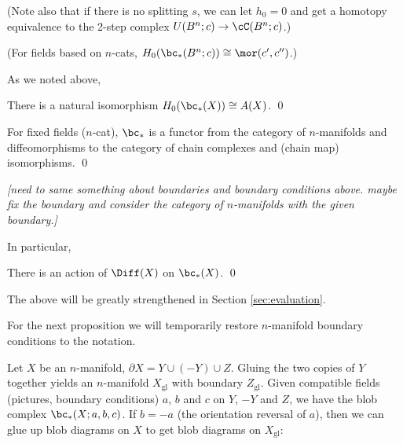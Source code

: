 \documentclass[11pt,leqno]{amsart}
\def\bd{\partial}
\def\sgl{_\mathrm{gl}}
\def\nn#1{{{\it \small [#1]}}}
\begin{document}
(Note also that if there is no splitting $s$, we can let $h_0 = 0$ and get a homotopy
equivalence to the 2-step complex $U(B^n; c) \to \cC(B^n; c)$.)

(For fields based on $n$-cats, $H_0(\bc_*(B^n; c)) \cong \mor(c', c'')$.)

\medskip

As we noted above,
\begin{prop}
There is a natural isomorphism $H_0(\bc_*(X)) \cong A(X)$.
\qed
\end{prop}







\begin{prop}
For fixed fields ($n$-cat), $\bc_*$ is a functor from the category
of $n$-manifolds and diffeomorphisms to the category of chain complexes and
(chain map) isomorphisms.
\qed
\end{prop}

\nn{need to same something about boundaries and boundary conditions above.
maybe fix the boundary and consider the category of $n$-manifolds with the given boundary.}


In particular,
\begin{prop}  \label{diff0prop}
There is an action of $\Diff(X)$ on $\bc_*(X)$.
\qed
\end{prop}

The above will be greatly strengthened in Section \ref{sec:evaluation}.

\medskip

For the next proposition we will temporarily restore $n$-manifold boundary
conditions to the notation.

Let $X$ be an $n$-manifold, $\bd X = Y \cup (-Y) \cup Z$.
Gluing the two copies of $Y$ together yields an $n$-manifold $X\sgl$
with boundary $Z\sgl$.
Given compatible fields (pictures, boundary conditions) $a$, $b$ and $c$ on $Y$, $-Y$ and $Z$,
we have the blob complex $\bc_*(X; a, b, c)$.
If $b = -a$ (the orientation reversal of $a$), then we can glue up blob diagrams on
$X$ to get blob diagrams on $X\sgl$:
\end{document}
